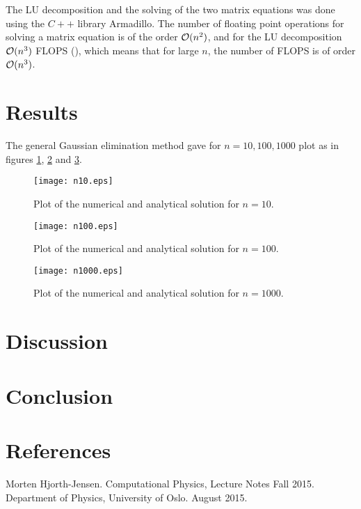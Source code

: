 \documentclass[norsk,a4paper,12pt]{article}
\begin{document}
The LU decomposition and the solving of the two matrix equations was done using the $C++$ library Armadillo. The number of floating point operations for solving a matrix equation is of the order ${\cal O}(n^2)$, and for the LU decomposition ${\cal O}(n^3)$ FLOPS (\cite[p. 173]{MHJ15}), which means that for large $n$, the number of FLOPS is of order ${\cal O}(n^3)$.
\section{Results}
The general Gaussian elimination method gave for $n=10,100,1000$ plot as in figures \ref{fig:n=10}, \ref{fig:n=100} and \ref{fig:n=1000}. 
\begin{figure}[h!]
\begin{center}
\texttt{[image: n10.eps]}
\caption{Plot of the numerical and analytical solution for $n=10$.}
\label{fig:n=10}
\end{center}
\end{figure}
\begin{figure}[h!]
\begin{center}
\texttt{[image: n100.eps]}
\caption{Plot of the numerical and analytical solution for $n=100$.}
\label{fig:n=100}
\end{center}
\end{figure}
\begin{figure}[h!]
\begin{center}
\texttt{[image: n1000.eps]}
\caption{Plot of the numerical and analytical solution for $n=1000$.}
\label{fig:n=1000}
\end{center}
\end{figure}
\section{Discussion}
\section{Conclusion}
\section{References}
\begingroup
\renewcommand{\section}[2]{}
\begin{thebibliography}{}
  Morten Hjorth-Jensen.
  Computational Physics, Lecture Notes Fall 2015.
  Department of Physics, University of Oslo.
  August 2015.

\end{thebibliography}
\endgroup
\end{document}
